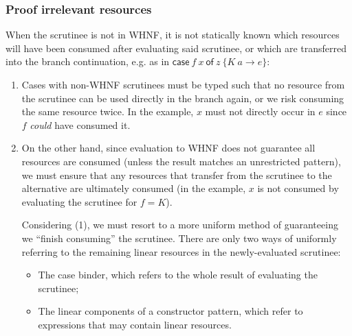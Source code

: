 \documentclass[acmsmall,review,screen]{acmart}
\newcommand{\ccase}[2]{\mathsf{case}~#1~\mathsf{of}~#2}
\begin{document}


\subsubsection{Proof irrelevant resources}

When the scrutinee is not in WHNF, it is not statically known which resources
will have been consumed after evaluating said scrutinee, or which
are transferred into the branch continuation, e.g. as in $\ccase{f\ x}{z\ \{K\
a \rightarrow e\}}$:
\begin{enumerate}

    \item Cases with non-WHNF scrutinees must be typed such that no resource
    from the scrutinee can be used directly in the branch again, or we
    risk
    consuming the same resource twice. In the example, $x$ must not directly occur
    in $e$ since $f$ \emph{could} have consumed it.

    \item On the other hand, since evaluation to WHNF does not guarantee all
    resources are consumed (unless the result matches an
    unrestricted pattern), we must ensure that any resources that transfer from the
    scrutinee to the alternative are ultimately consumed (in the example, $x$
    is not consumed by evaluating the scrutinee for $f = K$).

    Considering (1), we must resort to a more uniform method of guaranteeing we
    ``finish consuming'' the scrutinee. There are only two ways of
    uniformly referring to the remaining linear resources in the newly-evaluated scrutinee:

        \begin{itemize}
            \item The case binder, which refers to the whole result of evaluating the scrutinee;
            \item The linear components of a constructor pattern, which refer to expressions that may contain linear resources.
        \end{itemize}

%
\end{enumerate}
\end{document}
